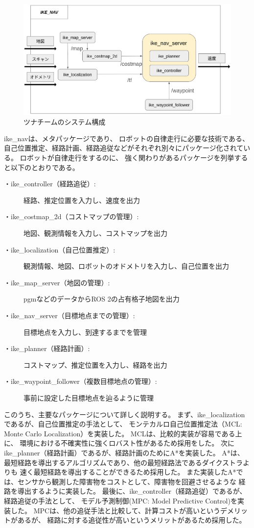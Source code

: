 \documentclass[twocolumn,9pt]{jsproceedings}
\begin{document}
\begin{figure}[h]
  \begin{center}
    \includegraphics[width=1.0\linewidth]{figs/ike_nav.pdf}
    \caption{ツナチームのシステム構成}
    \label{fig:tuna_system}
  \end{center}
\end{figure}

ike\_navは、メタパッケージであり、
ロボットの自律走行に必要な技術である、
自己位置推定、経路計画、経路追従などがそれぞれ別々にパッケージ化されている。
ロボットが自律走行をするのに、
強く関わりがあるパッケージを列挙すると以下のとおりである。

\begin{description}
  \item[・ike\_controller（経路追従）:]経路、推定位置を入力し、速度を出力
  \item[・ike\_costmap\_2d（コストマップの管理）:]地図、観測情報を入力し、コストマップを出力
  \item[・ike\_localization（自己位置推定）:]観測情報、地図、ロボットのオドメトリを入力し、自己位置を出力
  \item[・ike\_map\_server（地図の管理）:]pgmなどのデータからROS 2の占有格子地図を出力
  \item[・ike\_nav\_server（目標地点までの管理）:]目標地点を入力し、到達するまでを管理
  \item[・ike\_planner（経路計画）:]コストマップ、推定位置を入力し、経路を出力
  \item[・ike\_waypoint\_follower（複数目標地点の管理）:]事前に設定した目標地点を辿るように管理
\end{description}

このうち、主要なパッケージについて詳しく説明する。
まず、ike\_localizationであるが、自己位置推定の手法として、
モンテカルロ自己位置推定法（MCL: Monte Carlo Localization）\cite{fox1999etal}を実装した。
MCLは、比較的実装が容易である上に、
環境における不確実性に強くロバスト性があるため採用をした。
次にike\_planner（経路計画）であるが、経路計画のためにA*\cite{hart1968}を実装した。
A*は、最短経路を導出するアルゴリズムであり、他の最短経路法であるダイクストラ\cite{dijkstra1959}よりも
速く最短経路を導出することができるため採用した。
また実装したA*では、センサから観測した障害物をコストとして、障害物を回避させるような
経路を導出するように実装した。
最後に、ike\_controller（経路追従）であるが、経路追従の手法として、
モデル予測制御(MPC: Model Predictive Control)\cite{alberto2006}を実装した。
MPCは、他の追従手法と比較して、計算コストが高いというデメリットがあるが、
経路に対する追従性が高いというメリットがあるため採用した。
\end{document}
